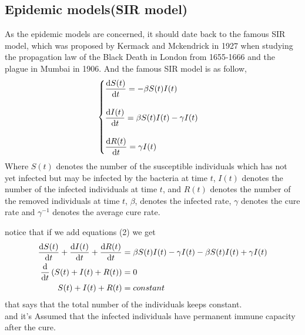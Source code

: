 \subsection{Epidemic models(SIR model)}
As the epidemic models are concerned, it should date back to the famous SIR model,
which was proposed by Kermack and Mckendrick in 1927 when studying the propagation
law of the Black Death in London from 1655-1666 and the plague in Mumbai in 1906.
And the famous SIR model is as follow,
\begin{equation}
    \begin{cases}
        \displaystyle \dv{S(t)}{t} = -\beta S(t)I(t)
        \\\\
        \displaystyle \dv{I(t)}{t} = \beta S(t)I(t)-\gamma I(t)
        \\\\
        \displaystyle \dv{R(t)}{t} = \gamma I(t)
    \end{cases}
\end{equation}
Where $S(t)$ denotes the number of the susceptible individuals which has not yet infected
but may be infected by the bacteria at time $t$, $I(t)$ denotes the number of the infected
individuals at time $t$, and $R(t)$ denotes the number of the removed individuals at time $t$, $\beta$,
denotes the infected rate, $\gamma$ denotes the cure rate and $\gamma^{-1}$ denotes the average cure rate.

notice that if we add equations (2) we get
\begin{align*}
    \dv{S(t)}{t} + \dv{I(t)}{t} + \dv{R(t)}{t} & = \beta S(t)I(t)-\gamma I(t) -\beta S(t)I(t) + \gamma I(t)
    \\
    \dv{}{t} \left(S(t) + I(t) + R(t)\right)   & = 0
    \\
    S(t) + I(t) + R(t)                         & = constant
\end{align*}
that says that the total number of the individuals keeps constant.
\\
and it's Assumed that the infected individuals have permanent immune capacity after the cure.





